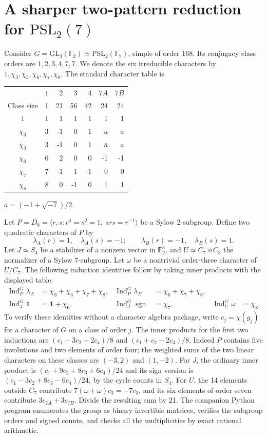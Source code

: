\documentclass[11pt]{article}
\theoremstyle{remark}\newtheorem{remark}[theorem]{Remark}
\newcommand{\Ind}{\operatorname{Ind}}
\newcommand{\one}{\mathbf{1}}
\begin{document}
\section{A sharper two-pattern reduction for \texorpdfstring{$\mathrm{PSL}_2(7)$}{PSL2(7)}}\label{sec:psl}
Consider $G=\mathrm{GL}_3(\mathbb F_2)\simeq\mathrm{PSL}_2(\mathbb F_7)$, simple of order 168. Its conjugacy class orders are $1,2,3,4,7,7$. We denote the six irreducible characters by $1,\chi_3,\overline\chi_3,\chi_6,\chi_7,\chi_8$. The standard character table \cite{groupnames} is
\begin{center}
\begin{tabular}{crrrrrr}
\toprule
 & $1$ & $2$ & $3$ & $4$ & $7A$ & $7B$\\
Class size & 1 & 21 & 56 & 42 & 24 & 24\\
\midrule
$1$ & 1 & 1 & 1 & 1 & 1 & 1\\
$\chi_3$ & 3 & -1 & 0 & 1 & $a$ & $\bar a$\\
$\overline\chi_3$ & 3 & -1 & 0 & 1 & $\bar a$ & $a$\\
$\chi_6$ & 6 & 2 & 0 & 0 & -1 & -1\\
$\chi_7$ & 7 & -1 & 1 & -1 & 0 & 0\\
$\chi_8$ & 8 & 0 & -1 & 0 & 1 & 1\\
\bottomrule
\end{tabular}
\qquad $a=(-1+\sqrt{-7})/2$.
\end{center}
Let $P=D_8=\langle r,s:r^4=s^2=1,\ srs=r^{-1}\rangle$ be a Sylow 2-subgroup. Define two quadratic characters of $P$ by
\[ \lambda_A(r)=1,\quad\lambda_A(s)=-1;\qquad
 \lambda_B(r)=-1,\quad\lambda_B(s)=1.\]
Let $J\simeq S_4$ be a stabilizer of a nonzero vector in $\mathbb F_2^3$, and $U\simeq C_7\rtimes C_3$ the normalizer of a Sylow 7-subgroup. Let $\omega$ be a nontrivial order-three character of $U/C_7$. The following induction identities follow by taking inner products with the displayed table:
\begin{align}
 \Ind_P^G\lambda_A&=\chi_3+\overline\chi_3+\chi_7+\chi_8,&
 \Ind_P^G\lambda_B&=\chi_6+\chi_7+\chi_8,\label{eq:indA}\\
 \Ind_J^G\one&=\one+\chi_6,&
 \Ind_J^G\operatorname{sgn}&=\chi_7,&
 \Ind_U^G\omega&=\chi_8.\label{eq:indB}
\end{align}
To verify these identities without a character algebra package, write $c_j=\chi(g_j)$ for a character of $G$ on a class of order $j$. The inner products for the first two inductions are $(c_1-3c_2+2c_4)/8$ and $(c_1+c_2-2c_4)/8$. Indeed $P$ contains five involutions and two elements of order four; the weighted sums of the two linear characters on these classes are $(-3,2)$ and $(1,-2)$. For $J$, the ordinary inner product is $(c_1+9c_2+8c_3+6c_4)/24$ and its sign version is $(c_1-3c_2+8c_3-6c_4)/24$, by the cycle counts in $S_4$. For $U$, the 14 elements outside $C_7$ contribute $7(\omega+\bar\omega)c_3=-7c_3$, and its six elements of order seven contribute $3c_{7A}+3c_{7B}$. Divide the resulting sum by 21. The companion Python program enumerates the group as binary invertible matrices, verifies the subgroup orders and signed counts, and checks all the multiplicities by exact rational arithmetic.
\end{document}
